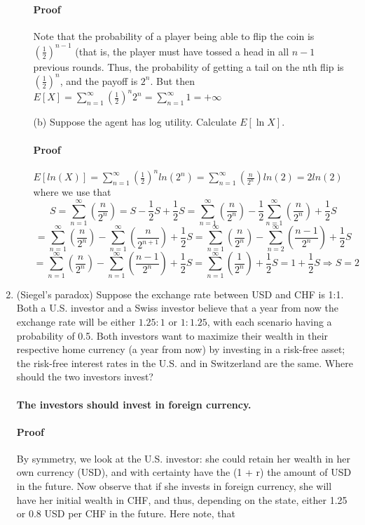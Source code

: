 \documentclass[letterpaper,12pt]{article}
\theoremstyle{definition}
\begin{document}
\begin{enumerate}
\begin{itemize}
            \paragraph{Proof} Note that the probability of a player being able to flip the coin is $(\frac{1}{2})^{n - 1}$ (that is, the player must have tossed a head in all $n - 1$ previous rounds. Thus, the probability of getting a tail on the nth flip is $(\frac{1}{2})^{n}$, and the payoff is $2^n$. But then $E[X] = \sum_{n = 1}^{\infty}(\frac{1}{2})^{n}2^n =  \sum_{n = 1}^{\infty} 1 = +\infty$
			\item[(b)] Suppose the agent has log utility. Calculate $E[\ln X]$.
            \paragraph{Proof} 
            $E[ln(X)] = \sum_{n = 1}^{\infty}(\frac{1}{2})^{n}ln(2^n) = \sum_{n = 1}^{\infty}(\frac{n}{2^n}) ln(2)=  2 ln(2)$ where we  use that $$ S = \sum_{n = 1}^{\infty}(\frac{n}{2^n}) = S - \frac{1}{2}S + \frac{1}{2} S  =  \sum_{n = 1}^{\infty}(\frac{n}{2^n}) -  \frac{1}{2} \sum_{n = 1}^{\infty}(\frac{n}{2^n}) + \frac{1}{2} S $$ $$= \sum_{n = 1}^{\infty}(\frac{n}{2^n}) - \sum_{n = 1}^{\infty}(\frac{n}{2^{n+1}}) +  \frac{1}{2} S  = \sum_{n = 1}^{\infty}(\frac{n}{2^n}) - \sum_{n = 2}^{\infty}(\frac{n - 1}{2^n}) +  \frac{1}{2} S  $$ $$ = \sum_{n = 1}^{\infty}(\frac{n}{2^n}) - \sum_{n = 1}^{\infty}(\frac{n - 1}{2^n}) +  \frac{1}{2} S= \sum_{n = 1}^{\infty}(\frac{1}{2^n}) +  \frac{1}{2} S= 1 + \frac{1}{2} S \Rightarrow S = 2 $$
		\end{itemize}
	\item (Siegel's paradox) Suppose the exchange rate between USD and CHF is 1:1. Both a U.S. investor and a Swiss investor believe that a year from now the exchange rate will be either $1.25:1$ or $1:1.25$, with each scenario having a probability of 0.5. Both investors want to maximize their wealth in their respective home currency (a year from now) by investing in a risk-free asset; the risk-free interest rates in the U.S. and in Switzerland are the same. Where should the two investors invest?
    
	\paragraph{The investors should invest in foreign currency.}
    \paragraph{Proof} By symmetry, we look at the U.S. investor: she could retain her wealth in her own currency (USD), and with certainty have  the (1 + r) the amount of USD in the future. Now observe that if she invests in foreign currency, she will have her initial wealth in CHF, and thus, depending on the state, either 1.25 or 0.8 USD per CHF in the future. Here note, that
    

\end{enumerate}
\end{document}
